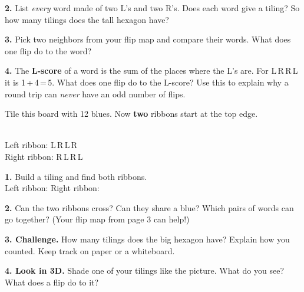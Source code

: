 \vspace{0.1in}
\textbf{2.} List \emph{every} word made of two L's and two R's. Does each word give a tiling?
So how many tilings does the tall hexagon have?

\vspace{0.15in}
\textbf{3.} Pick two neighbors from your flip map and compare their words.
What does one flip do to the word?

\vspace{0.15in}
\textbf{4.} The \textbf{L-score} of a word is the sum of the places where the L's are.
For L\,R\,R\,L it is 1\,+\,4\,=\,5. What does one flip do to the L-score?
Use this to explain why a round trip can \emph{never} have an odd number of flips.
\newpage

\noindent
\begin{minipage}[t]{4.1in}\vspace{0pt}\end{minipage}\hfill
\begin{minipage}[t]{3.1in}\vspace{0pt}
Tile this board with 12 blues. Now \textbf{two} ribbons start at the top edge.

\vspace{0.12in}
\centering{}\\[4pt]
{\normalsize Left ribbon: L\,R\,L\,R\\Right ribbon: R\,L\,R\,L}
\end{minipage}

\vspace{0.25in}
\textbf{1.} Build a tiling and find both ribbons.\\[4pt]
Left ribbon: \blank[1.1in]\qquad Right ribbon: \blank[1.1in]

\vspace{0.2in}
\textbf{2.} Can the two ribbons cross? Can they share a blue? Which pairs of words can
go together? (Your flip map from page 3 can help!)

\vspace{0.2in}
\noindent
\begin{minipage}[c]{4.95in}
\textbf{3. Challenge.} How many tilings does the big hexagon have?
Explain how you counted. Keep track on paper or a whiteboard.

\vspace{0.15in}
\textbf{4. Look in 3D.} Shade one of your tilings like the picture.
What do you see? What does a flip do to it?
\end{minipage}\hfill
\begin{minipage}[c]{2.25in}\raggedleft{}\end{minipage}

